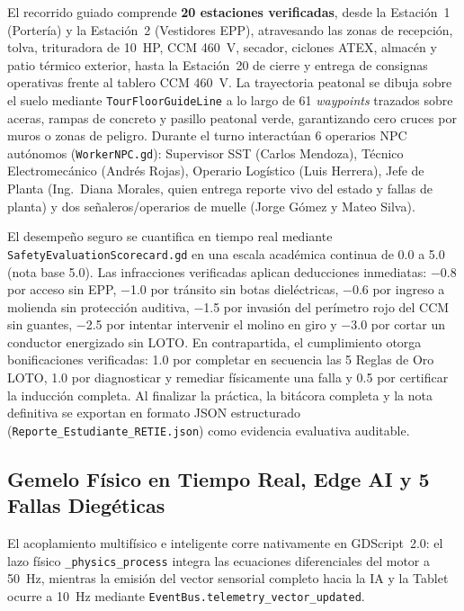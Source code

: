 El recorrido guiado comprende \textbf{20 estaciones verificadas}, desde la Estación~1 (Portería) y la Estación~2 (Vestidores EPP), atravesando las zonas de recepción, tolva, trituradora de \qty{10}{HP}, CCM \qty{460}{\volt}, secador, ciclones ATEX, almacén y patio térmico exterior, hasta la Estación~20 de cierre y entrega de consignas operativas frente al tablero CCM \qty{460}{\volt}. La trayectoria peatonal se dibuja sobre el suelo mediante \texttt{Tour\allowbreak Floor\allowbreak Guide\allowbreak Line} a lo largo de \num{61} \emph{waypoints} trazados sobre aceras, rampas de concreto y pasillo peatonal verde, garantizando cero cruces por muros o zonas de peligro. Durante el turno interactúan \num{6} operarios NPC autónomos (\texttt{WorkerNPC.gd}): Supervisor SST (Carlos Mendoza), Técnico Electromecánico (Andrés Rojas), Operario Logístico (Luis Herrera), Jefe de Planta (Ing.~Diana Morales, quien entrega reporte vivo del estado y fallas de planta) y dos señaleros/operarios de muelle (Jorge Gómez y Mateo Silva).

El desempeño seguro se cuantifica en tiempo real mediante \texttt{Safety\allowbreak Evaluation\allowbreak Scorecard.gd} en una escala académica continua de \num{0.0} a \num{5.0} (nota base \num{5.0}). Las infracciones verificadas aplican deducciones inmediatas: \num{-0.8} por acceso sin EPP, \num{-1.0} por tránsito sin botas dieléctricas, \num{-0.6} por ingreso a molienda sin protección auditiva, \num{-1.5} por invasión del perímetro rojo del CCM sin guantes, \num{-2.5} por intentar intervenir el molino en giro y \num{-3.0} por cortar un conductor energizado sin LOTO. En contrapartida, el cumplimiento otorga bonificaciones verificadas: \num{+1.0} por completar en secuencia las 5 Reglas de Oro LOTO, \num{+1.0} por diagnosticar y remediar físicamente una falla y \num{+0.5} por certificar la inducción completa. Al finalizar la práctica, la bitácora completa y la nota definitiva se exportan en formato JSON estructurado (\texttt{Reporte\_\allowbreak Estudiante\_\allowbreak RETIE.json}) como evidencia evaluativa auditable.

\subsection{Gemelo Físico en Tiempo Real, Edge AI y 5 Fallas Diegéticas}\label{subsec:gemelo_ia_fallas}

El acoplamiento multifísico e inteligente corre nativamente en GDScript~2.0: el lazo físico \texttt{\_physics\_process} integra las ecuaciones diferenciales del motor a \qty{50}{\hertz}, mientras la emisión del vector sensorial completo hacia la IA y la Tablet ocurre a \qty{10}{\hertz} mediante \texttt{EventBus.\allowbreak telemetry\_\allowbreak vector\_\allowbreak updated}.

